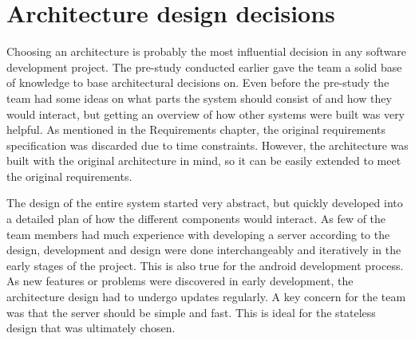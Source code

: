 \section{Architecture design decisions}
Choosing an architecture is probably the most influential decision in any software development project. The pre-study conducted earlier gave the team a solid base of knowledge to base architectural 
decisions on. Even before the pre-study the team had some ideas on what parts the system should consist of and how they would interact, but getting an overview of how other systems were built was 
very helpful. As mentioned in the Requirements chapter, the original requirements specification was discarded due to time constraints. However, the architecture was built with the original architecture in mind, so it can be easily extended to meet the original requirements.

The design of the entire system started very abstract, but quickly developed into a detailed plan of how the different components would interact. As few of the team members had much 
experience with developing a server according to the design, development and design were done interchangeably and iteratively in the early stages of the project. This is also true for the 
android development process. As new features or problems were discovered in early development, the architecture design had to undergo updates regularly. A key concern for the team was that the 
server should be simple and fast. This is ideal for the stateless design that was ultimately chosen. 